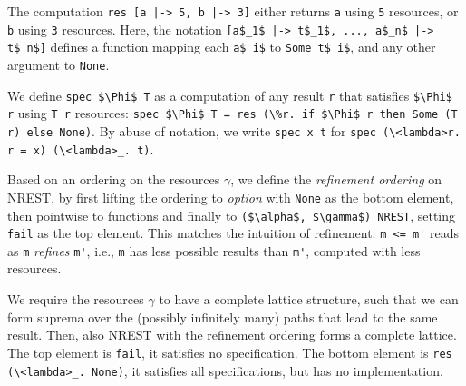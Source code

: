 \documentclass[acmsmall]{acmart}
\newcommand{\is}{\lstinline[language=isabelle]}
\begin{document}
\begin{example}
The computation \is{res [a |-> 5, b |-> 3]} either returns \is{a} using \is{5} resources, or \is{b} using \is{3} resources. 
Here, the notation \is{[a$_1$ |-> t$_1$, ..., a$_n$ |-> t$_n$]} defines a function mapping each \is{a$_i$} to \is{Some t$_i$}, and any other argument to \is$None$.
\end{example}














We define \is{spec $\Phi$ T} as a computation 
of any result \is{r} that satisfies \is{$\Phi$ r} using \is{T r} resources: \is{spec $\Phi$ T = res (\%r. if $\Phi$ r then Some (T r) else None)}.
By abuse of notation, we write \is{spec x t} for \is{spec (\<lambda>r. r = x) (\<lambda>_. t)}.

Based on an ordering on the resources $\gamma$, we define the \emph{refinement ordering} on NREST, 
by first lifting the ordering to \emph{option} with \is{None} as the bottom element, then pointwise to functions and finally to \is{($\alpha$, $\gamma$) NREST}, setting \is{fail} as the top element. This matches the intuition of refinement: \is$m <= m'$ reads as \is{m} \emph{refines} \is{m'}, i.e., \is$m$ has less possible results than \is$m'$, computed with less resources. 

We require the resources $\gamma$ to have a complete lattice structure, such that we can form suprema over the (possibly infinitely many) paths that lead to the same result. 
Then, also NREST with the refinement ordering forms a complete lattice. The top element is \is{fail}, it satisfies no specification. The bottom element is \is{res (\<lambda>_. None)}, it satisfies all specifications, but has no implementation.
\end{document}
